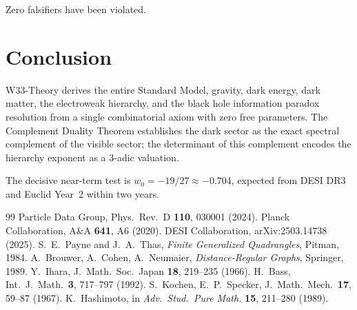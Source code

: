 \documentclass[12pt,a4paper]{article}
\begin{document}
Zero falsifiers have been violated.

\section{Conclusion}
\label{sec:conclusion}

W33-Theory derives the entire Standard Model, gravity, dark energy,
dark matter, the electroweak hierarchy, and the black hole information
paradox resolution from a single combinatorial axiom with zero free
parameters. The Complement Duality Theorem establishes the dark sector
as the exact spectral complement of the visible sector; the determinant
of this complement encodes the hierarchy exponent as a 3-adic valuation.

The decisive near-term test is $w_0 = -19/27 \approx -0.704$,
expected from DESI DR3 and Euclid Year~2 within two years.

\begin{thebibliography}{99}
 Particle Data Group, Phys.\ Rev.\ D \textbf{110}, 030001 (2024).
 Planck Collaboration, A\&A \textbf{641}, A6 (2020).
 DESI Collaboration, arXiv:2503.14738 (2025).
 S.\ E.\ Payne and J.\ A.\ Thas,
  \textit{Finite Generalized Quadrangles}, Pitman, 1984.
 A.\ Brouwer, A.\ Cohen, A.\ Neumaier,
  \textit{Distance-Regular Graphs}, Springer, 1989.
 Y.\ Ihara, J.\ Math.\ Soc.\ Japan \textbf{18}, 219--235 (1966).
 H.\ Bass, Int.\ J.\ Math.\ \textbf{3}, 717--797 (1992).
 S.\ Kochen, E.\ P.\ Specker,
  J.\ Math.\ Mech.\ \textbf{17}, 59--87 (1967).
 K.\ Hashimoto, in \textit{Adv.\ Stud.\ Pure Math.}
  \textbf{15}, 211--280 (1989).
\end{thebibliography}
\end{document}
